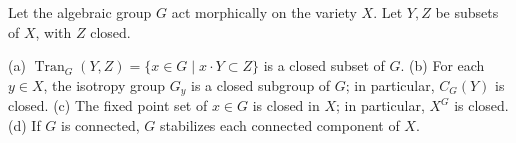 Let the algebraic group $G$ act morphically on the variety $X$. Let $Y, Z$ be subsets of $X$, with $Z$ closed.

(a) $\operatorname{Tran}_G(Y, Z) = \{x \in G \mid x \cdot Y \subset Z\}$ is a closed subset of $G$.
(b) For each $y \in X$, the isotropy group $G_y$ is a closed subgroup of $G$; in particular, $C_G(Y)$ is closed.
(c) The fixed point set of $x \in G$ is closed in $X$; in particular, $X^G$ is closed.
(d) If $G$ is connected, $G$ stabilizes each connected component of $X$.
